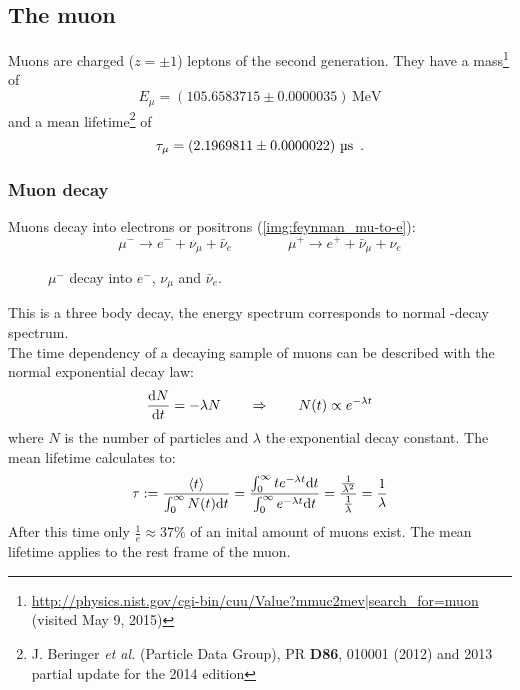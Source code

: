 \subsection{The muon}
Muons are charged ($z=\pm1$) leptons of the second generation. They have a mass\footnote{\url{http://physics.nist.gov/cgi-bin/cuu/Value?mmuc2mev|search_for=muon} (visited May 9, 2015)} of 
\begin{equation}
	\label{eq:litval:mass}
    E_\mu = (105.6583715 \pm 0.0000035)\,\text{MeV}
\end{equation}
and a mean lifetime\footnote{J. Beringer \emph{et al.} (Particle Data Group), PR \textbf{D86}, 010001 (2012) and 2013 partial update for the 2014 edition} of 
\begin{equation}
	\label{eq:litval:meanlifetime}
    \tau_\mu = \left( 2.1969811 \pm 0.0000022 \right)\,\text{\textmu s}\ \, .
\end{equation}
\subsubsection{Muon decay}
\label{sub:decay}
Muons decay into electrons or positrons (\autoref{img:feynman_mu-to-e}):
\begin{equation}
	\mu^- \rightarrow e^- + \nu_\mu + \bar{\nu}_e \qquad \qquad \mu^+ \rightarrow e^+ + \bar{\nu}_\mu + \nu_e
\end{equation}
\begin{figure}[H]
        \centering
        \def\svgwidth{0.35\textwidth}
       
        \caption{$\mu^-$ decay into $e^-$, $\nu_\mu$ and $\bar{\nu}_e$.}
        \label{img:feynman_mu-to-e}
\end{figure}
This is a three body decay, the energy spectrum corresponds to normal \textbeta-decay spectrum. \\
The time dependency of a decaying sample of muons can be described with the normal exponential decay law:
\begin{equation}
	\label{eq:expdecay}
	\frac{\mathrm{d} N}{\mathrm{d} t} = - \lambda N \qquad \Rightarrow \qquad N(t) \propto e^{-\lambda t}
\end{equation}
where $N$ is the number of particles and $\lambda$ the exponential decay constant. The mean lifetime calculates to:
\begin{equation}
    \tau := \frac{\left<t\right>}{\int_0^\infty N(t) \mathrm{d} t} = 
    \frac{\int_0^\infty t e^{-\lambda t} \mathrm{d} t}{\int_0^\infty e^{-\lambda t} \mathrm{d} t} = 
    \frac{\frac{1}{\lambda^2}}{\frac{1}{\lambda}} = \frac{1}{\lambda}
\end{equation}
After this time only $\frac{1}{e} \approx 37\%$ of an inital amount of muons exist. The mean lifetime applies to the rest frame of the muon.
